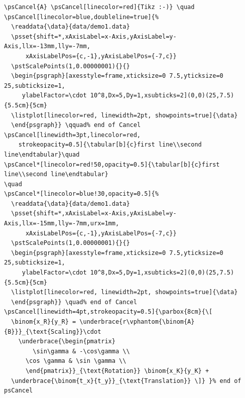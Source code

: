 \documentclass[11pt,english,BCOR=10mm,DIV=12,bibliography=totoc,parskip=false,headings=small,
    headinclude=false,footinclude=false,oneside]{pst-doc}
\begin{document}
 \quad%
\psCancel[linewidth=4pt,strokeopacity=0.5]{\parbox{8cm}{\[
  \binom{x_R}{y_R} = \underbrace{r\vphantom{\binom{A}{B}}}_{\text{Scaling}}\cdot
    \underbrace{\begin{pmatrix}
        \sin\gamma & -\cos\gamma \\
      \cos \gamma & \sin \gamma \\
      \end{pmatrix}}_{\text{Rotation}} \binom{x_K}{y_K} +
  \underbrace{\binom{t_x}{t_y}}_{\text{Translation}} \]} }%
\endgroup

\bigskip
\begin{lstlisting}
\psCancel{A} \psCancel[linecolor=red]{Tikz :-)} \quad
\psCancel[linecolor=blue,doubleline=true]{%
  \readdata{\data}{data/demo1.data}
  \psset{shift=*,xAxisLabel=x-Axis,yAxisLabel=y-Axis,llx=-13mm,lly=-7mm,
      xAxisLabelPos={c,-1},yAxisLabelPos={-7,c}}
  \pstScalePoints(1,0.00000001){}{}
  \begin{psgraph}[axesstyle=frame,xticksize=0 7.5,yticksize=0 25,subticksize=1,
     ylabelFactor=\cdot 10^8,Dx=5,Dy=1,xsubticks=2](0,0)(25,7.5){5.5cm}{5cm}
  \listplot[linecolor=red, linewidth=2pt, showpoints=true]{\data}
  \end{psgraph}} \qquad% end of Cancel
\psCancel[linewidth=3pt,linecolor=red,
    strokeopacity=0.5]{\tabular[b]{c}first line\\second line\endtabular}\quad
\psCancel*[linecolor=red!50,opacity=0.5]{\tabular[b]{c}first line\\second line\endtabular}
\quad
\psCancel*[linecolor=blue!30,opacity=0.5]{%
  \readdata{\data}{data/demo1.data}
  \psset{shift=*,xAxisLabel=x-Axis,yAxisLabel=y-Axis,llx=-15mm,lly=-7mm,urx=1mm,
      xAxisLabelPos={c,-1},yAxisLabelPos={-7,c}}
  \pstScalePoints(1,0.00000001){}{}
  \begin{psgraph}[axesstyle=frame,xticksize=0 7.5,yticksize=0 25,subticksize=1,
     ylabelFactor=\cdot 10^8,Dx=5,Dy=1,xsubticks=2](0,0)(25,7.5){5.5cm}{5cm}
  \listplot[linecolor=red, linewidth=2pt, showpoints=true]{\data}
  \end{psgraph}} \quad% end of Cancel
\psCancel[linewidth=4pt,strokeopacity=0.5]{\parbox{8cm}{\[
  \binom{x_R}{y_R} = \underbrace{r\vphantom{\binom{A}{B}}}_{\text{Scaling}}\cdot
    \underbrace{\begin{pmatrix}
        \sin\gamma & -\cos\gamma \\
      \cos \gamma & \sin \gamma \\
      \end{pmatrix}}_{\text{Rotation}} \binom{x_K}{y_K} +
  \underbrace{\binom{t_x}{t_y}}_{\text{Translation}} \]} }% end of psCancel
\end{lstlisting}
\end{document}
